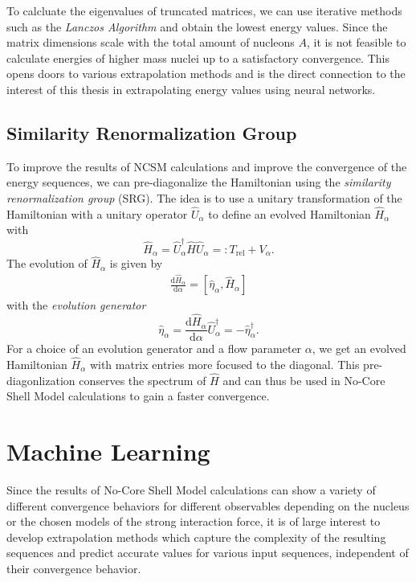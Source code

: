 To calcluate the eigenvalues of truncated matrices, we can use iterative methods such as the \textit{Lanczos Algorithm} and obtain the lowest energy values. Since the matrix dimensions scale with the total amount of nucleons $A$, it is not feasible to calculate energies of higher mass nuclei up to a satisfactory convergence. This opens doors to various extrapolation methods and is the direct connection to the interest of this thesis in extrapolating energy values using neural networks.

\subsection{Similarity Renormalization Group}
To improve the results of NCSM calculations and improve the convergence of the energy sequences, we can pre-diagonalize the Hamiltonian using the \textit{similarity renormalization group} (SRG). The idea is to use a unitary transformation of the Hamiltonian with a unitary operator $\hat{U}_\alpha$ to define an evolved Hamiltonian $\hat{H}_\alpha$ with
\begin{equation}
  \hat{H}_\alpha = \hat{U}_\alpha^\dagger \hat{H} \hat{U}_\alpha =: T_\mathrm{rel} + V_\alpha.
\end{equation}
The evolution of $\hat{H}_\alpha$ is given by
\begin{align}
  \frac{\mathrm{d}\hat{H}_\alpha}{\mathrm{d}\alpha} = [\hat{\eta}_\alpha, \hat{H}_\alpha]
\end{align}
with the \textit{evolution generator}
\begin{equation}
  \hat{\eta}_\alpha = \frac{\mathrm{d}\hat{H}_\alpha}{\mathrm{d}\alpha} \hat{U}^\dagger_\alpha = -\hat{\eta}_\alpha^\dagger.
\end{equation}
For a choice of an evolution generator and a flow parameter $\alpha$, we get an evolved Hamiltonian $\hat{H}_\alpha$ with matrix entries more focused to the diagonal. This pre-diagonlization conserves the spectrum of $\hat{H}$ and can thus be used in No-Core Shell Model calculations to gain a faster convergence.

\section{Machine Learning}

Since the results of No-Core Shell Model calculations can show a variety of different convergence behaviors for different observables depending on the nucleus or the chosen models of the strong interaction force, it is of large interest to develop extrapolation methods which capture the complexity of the resulting sequences and predict accurate values for various input sequences, independent of their convergence behavior.

